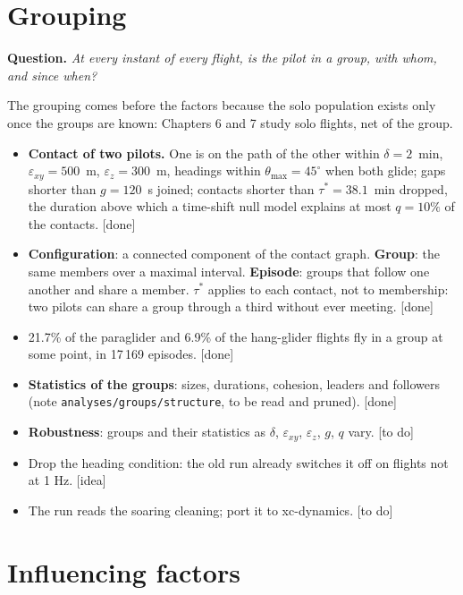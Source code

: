 \documentclass[11pt]{article}
\newcommand{\done}{\textcolor{green!45!black}{\textsf{[done]}}}
\newcommand{\todo}{\textcolor{orange!85!black}{\textsf{[to do]}}}
\newcommand{\idea}{\textcolor{blue!70!black}{\textsf{[idea]}}}
\newcommand{\Q}[1]{\noindent\textbf{Question.} \emph{#1}\par\smallskip}
\begin{document}
\section{Grouping}

\Q{At every instant of every flight, is the pilot in a group, with whom, and since when?}

\noindent The grouping comes before the factors because the solo population exists only once the
groups are known: Chapters 6 and 7 study solo flights, net of the group.

\begin{itemize}
  \item \textbf{Contact of two pilots.} One is on the path of the other within $\delta=2$~min,
        $\varepsilon_{xy}=500$~m, $\varepsilon_z=300$~m, headings within $\theta_{\max}=45^\circ$ when
        both glide; gaps shorter than $g=120$~s joined; contacts shorter than $\tau^*=38.1$~min
        dropped, the duration above which a time-shift null model explains at most $q=10\%$ of the
        contacts. \done
  \item \textbf{Configuration}: a connected component of the contact graph. \textbf{Group}: the same
        members over a maximal interval. \textbf{Episode}: groups that follow one another and share a
        member. $\tau^*$ applies to each contact, not to membership: two pilots can share a group
        through a third without ever meeting. \done
  \item 21.7\% of the paraglider and 6.9\% of the hang-glider flights fly in a group at some point,
        in 17\,169 episodes. \done
  \item \textbf{Statistics of the groups}: sizes, durations, cohesion, leaders and followers
        (note \texttt{analyses/groups/structure}, to be read and pruned). \done
  \item \textbf{Robustness}: groups and their statistics as $\delta$, $\varepsilon_{xy}$,
        $\varepsilon_z$, $g$, $q$ vary. \todo
  \item Drop the heading condition: the old run already switches it off on flights not at 1 Hz. \idea
  \item The run reads the soaring cleaning; port it to xc-dynamics. \todo
\end{itemize}

\section{Influencing factors}
\end{document}
